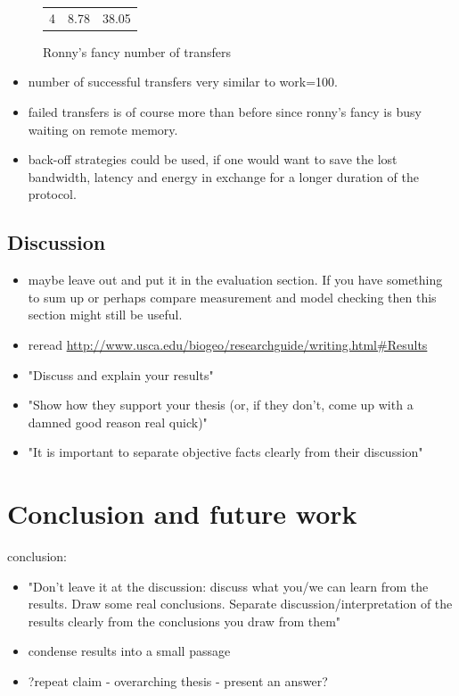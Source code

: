 \documentclass[a4paper, 10pt]{article}
\begin{document}
\begin{itemize}
\begin{itemize}
\begin{figure}[htbp]
\begin{tabular}{r | r r}
						4       & 8.78                  & 38.05           \\
					\end{tabular}
					\caption{Ronny's fancy number of transfers}
					\label{fig:df-transfers-1000}
				\end{figure}
				\begin{itemize}
					\item number of successful transfers very similar to work=100.
					\item failed transfers is of course more than before since ronny's fancy is busy waiting on remote memory.
					\item back-off strategies could be used, if one would want to save the lost bandwidth, latency and energy in exchange for a longer duration of the protocol.
				\end{itemize}
		\end{itemize}
\end{itemize}

\subsection{Discussion}
\label{ssec:analysis-discussion}
\begin{itemize}
	\item maybe leave out and put it in the evaluation section. If you have something to sum up or perhaps compare measurement and model checking then this section might still be useful.
	\item reread \url{http://www.usca.edu/biogeo/researchguide/writing.html#Results}
	\item "Discuss and explain your results"
	\item "Show how they support your thesis (or, if they don't, come up with a damned good reason real quick)"
	\item "It is important to separate objective facts clearly from their discussion"
\end{itemize}

\section{Conclusion and future work}
\label{sec:conclusion}
conclusion:
\begin{itemize}
	\item "Don't leave it at the discussion: discuss what you/we can learn from the results. Draw some real conclusions. Separate discussion/interpretation of the results clearly from the conclusions you draw from them"
	\item condense results into a small passage
	\item ?repeat claim - overarching thesis - present an answer?
\end{itemize}
\end{document}
